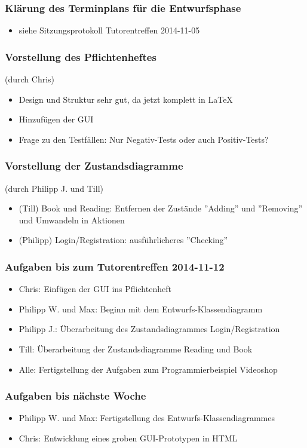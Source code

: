 \documentclass[12pt,a4paper]{article}
\begin{document}
\subsubsection*{Klärung des Terminplans für die Entwurfsphase}
\begin{itemize}
\item siehe Sitzungsprotokoll Tutorentreffen 2014-11-05
\end{itemize}

\subsubsection*{Vorstellung des Pflichtenheftes}
(durch Chris)
\begin{itemize}
\item Design und Struktur sehr gut, da jetzt komplett in \LaTeX
\item Hinzufügen der GUI
\item Frage zu den Testfällen: Nur Negativ-Tests oder auch Positiv-Tests? 
\end{itemize}

\subsubsection*{Vorstellung der Zustandsdiagramme}
(durch Philipp J. und Till)
\begin{itemize}
\item (Till) Book und Reading: Entfernen der Zustände ''Adding'' und ''Removing'' und Umwandeln in Aktionen
\item (Philipp) Login/Registration: ausführlicheres ''Checking''
\end{itemize}

\subsubsection*{Aufgaben bis zum Tutorentreffen 2014-11-12}
\begin{itemize}
\item Chris: Einfügen der GUI ins Pflichtenheft
\item Philipp W. und Max: Beginn mit dem Entwurfs-Klassendiagramm
\item Philipp J.: Überarbeitung des Zustandsdiagrammes Login/Registration
\item Till: Überarbeitung der Zustandsdiagramme Reading und Book
\item Alle: Fertigstellung der Aufgaben zum Programmierbeispiel Videoshop
\end{itemize}

\subsubsection*{Aufgaben bis nächste Woche}
\begin{itemize}
\item Philipp W. und Max: Fertigstellung des Entwurfs-Klassendiagrammes
\item Chris: Entwicklung eines groben GUI-Prototypen in HTML
\end{itemize}
\end{document}
